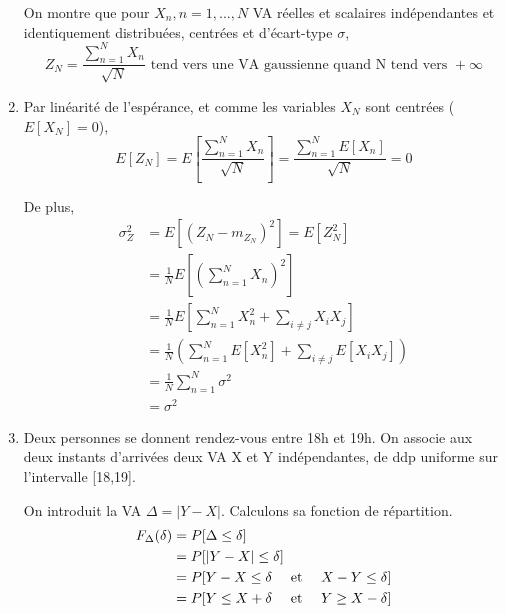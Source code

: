 \documentclass[main.tex]{subfiles}
\begin{document}
\begin{enumerate}
On montre que pour $X_n, n=1,...,N$ VA réelles et scalaires indépendantes et identiquement distribuées, centrées et d'écart-type $\sigma$,
\[Z_N = \frac{\sum_{n=1}^N X_n}{\sqrt{N}} \text{ tend vers une VA gaussienne quand N tend vers } +\infty \]

\item Par linéarité de l'espérance, et comme les variables $X_N$ sont centrées ($E[X_N] = 0$),
\[ E[Z_N] = E[\frac{\sum_{n=1}^N X_n}{\sqrt{N}}] = \frac{\sum_{n=1}^N E[X_n]}{\sqrt{N}} = 0 \]

De plus, 
\begin{align*}
\sigma_Z^2 & = E[(Z_N - m_{Z_N})^2] = E[Z_N^2] \\
& = \frac{1}{N} E[(\sum_{n=1}^N X_n)^2] \\
& = \frac{1}{N} E[ \sum_{n=1}^N X_n^2 + \sum_{i\neq j} X_iX_j] \\
& = \frac{1}{N} (\sum_ {n=1}^N E[X_n^2] + \sum_{i\neq j} E[X_iX_j]) \\
& = \frac{1}{N} \sum_{n=1}^N \sigma^2 \\
& = \sigma^2
\end{align*} 
\newpage
\item Deux personnes se donnent rendez-vous entre 18h et 19h. On associe aux deux instants d'arrivées deux VA X et Y indépendantes, de ddp uniforme sur l'intervalle [18,19].

On introduit la VA $\Delta = |Y-X|$. Calculons sa fonction de répartition.
\begin{align*}
F_{\Delta}(\delta) & = P[\Delta \leq \delta] \\
& = P[ |Y-X| \leq \delta ] \\
& = P[ Y-X \leq \delta \quad\text{ et }\quad X-Y \leq \delta ] \\
& = P[ Y \leq X + \delta \quad\text{ et }\quad Y \geq X - \delta ]
\end{align*}

\begin{figure}[h!]
\centering
{}
\end{figure}
\end{enumerate}
\end{document}
